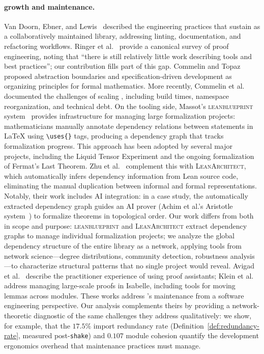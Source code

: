 \paragraph{ growth and maintenance.}
Van Doorn, Ebner, and Lewis~\cite{vandoorn2020} described the engineering practices that sustain  as a collaboratively maintained library, addressing linting, documentation, and refactoring workflows. Ringer et al.~\cite{ringer2019} provide a canonical survey of proof engineering, noting that ``there is still relatively little work describing tools and best practices''; our contribution fills part of this gap. Commelin and Topaz~\cite{commelin2023} proposed abstraction boundaries and specification-driven development as organizing principles for formal mathematics. More recently, Commelin et al.~\cite{baanen2025} documented the challenges of scaling , including build times, namespace reorganization, and technical debt. On the tooling side, Massot's \textsc{leanblueprint} system~\cite{massot2020leanblueprint} provides infrastructure for managing large formalization projects: mathematicians manually annotate dependency relations between statements in \LaTeX{} using \verb|\uses{}| tags, producing a dependency graph that tracks formalization progress. This approach has been adopted by several major projects, including the Liquid Tensor Experiment and the ongoing formalization of Fermat's Last Theorem. Zhu et al.~\cite{zhu2025leanarchitect} complement this with \textsc{LeanArchitect}, which automatically infers dependency information from Lean source code, eliminating the manual duplication between informal and formal representations. Notably, their work includes AI integration: in a case study, the automatically extracted dependency graph guides an AI prover (Achim et al.'s Aristotle system~\cite{achim2025aristotle}) to formalize theorems in topological order. Our work differs from both in scope and purpose: \textsc{leanblueprint} and \textsc{LeanArchitect} extract dependency graphs to manage individual formalization projects; we analyze the global dependency structure of the entire  library as a network, applying tools from network science---degree distributions, community detection, robustness analysis---to characterize structural patterns that no single project would reveal. Avigad et al.~\cite{avigad2025anatomy} describe the practitioner experience of using proof assistants; Klein et al.~\cite{klein2012} address managing large-scale proofs in Isabelle, including tools for moving lemmas across modules. These works address 's maintenance from a software engineering perspective. Our analysis complements theirs by providing a network-theoretic diagnostic of the same challenges they address qualitatively: we show, for example, that the $17.5\%$ import redundancy rate (Definition~\ref{def:redundancy-rate}, measured post-\texttt{shake}) and $0.107$ module cohesion quantify the development ergonomics overhead that maintenance practices must manage.

